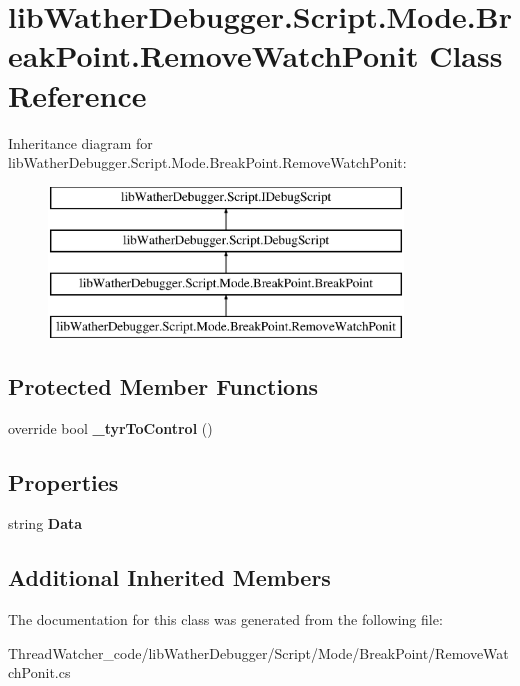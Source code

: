 \hypertarget{classlib_wather_debugger_1_1_script_1_1_mode_1_1_break_point_1_1_remove_watch_ponit}{\section{lib\+Wather\+Debugger.\+Script.\+Mode.\+Break\+Point.\+Remove\+Watch\+Ponit Class Reference}
\label{classlib_wather_debugger_1_1_script_1_1_mode_1_1_break_point_1_1_remove_watch_ponit}
}
Inheritance diagram for lib\+Wather\+Debugger.\+Script.\+Mode.\+Break\+Point.\+Remove\+Watch\+Ponit\+:\begin{figure}[H]
\begin{center}
\leavevmode
\includegraphics[height=4.000000cm]{classlib_wather_debugger_1_1_script_1_1_mode_1_1_break_point_1_1_remove_watch_ponit}
\end{center}
\end{figure}
\subsection*{Protected Member Functions}
\begin{DoxyCompactItemize}
\item 
\hypertarget{classlib_wather_debugger_1_1_script_1_1_mode_1_1_break_point_1_1_remove_watch_ponit_a78501e559650d6fc4f941ecb708d03d9}{override bool {\bfseries \+\_\+tyr\+To\+Control} ()}\label{classlib_wather_debugger_1_1_script_1_1_mode_1_1_break_point_1_1_remove_watch_ponit_a78501e559650d6fc4f941ecb708d03d9}

\end{DoxyCompactItemize}
\subsection*{Properties}
\begin{DoxyCompactItemize}
\item 
\hypertarget{classlib_wather_debugger_1_1_script_1_1_mode_1_1_break_point_1_1_remove_watch_ponit_a17c391cf57470b7f5fe96fb4d3e9cf91}{string {\bfseries Data}}\label{classlib_wather_debugger_1_1_script_1_1_mode_1_1_break_point_1_1_remove_watch_ponit_a17c391cf57470b7f5fe96fb4d3e9cf91}

\end{DoxyCompactItemize}
\subsection*{Additional Inherited Members}


The documentation for this class was generated from the following file\+:\begin{DoxyCompactItemize}
\item 
Thread\+Watcher\+\_\+code/lib\+Wather\+Debugger/\+Script/\+Mode/\+Break\+Point/Remove\+Watch\+Ponit.\+cs\end{DoxyCompactItemize}

